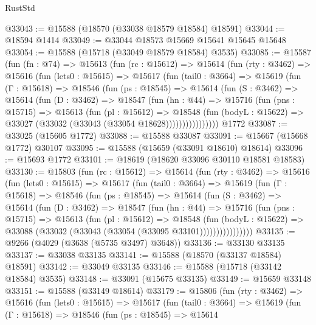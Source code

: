 \begin{lexlean}{RustStd}
\begin{coremodule}
@33043 := @15588 (@18570 (@33038 @18579 @18584) @18591)
@33044 := @18594 @1414
@33049 := @33044 @18573 @15669 @15641 @15645 @15648
@33054 := @15588 (@15718 (@33049 @18579 @18584) @3535)
@33085 := @15587
    (fun (fn : @74) =>
    @15613
      (fun (rc : @15612) =>
      @15614
        (fun (rty : @3462) =>
        @15616
          (fun (lets0 : @15615) =>
          @15617
            (fun (tail0 : @3664) =>
            @15619
              (fun (Γ : @15618) =>
              @18546
                (fun (ps : @18545) =>
                @15614
                  (fun (S : @3462) =>
                  @15614
                    (fun (D : @3462) =>
                    @18547
                      (fun (hn : @44) =>
                      @15716
                        (fun (pns : @15715) =>
                        @15613
                          (fun (pl : @15612) =>
                          @18548
                            (fun (bodyL : @15622) =>
                            @33027 (@33032 (@33043 (@33054 @18628))))))))))))))))
    @1772
@33087 := @33025 (@15605 @1772)
@33088 := @15588 @33087
@33091 := @15667 (@15668 @1772) @30107
@33095 := @15588 (@15659 (@33091 @18610) @18614)
@33096 := @15693 @1772
@33101 := @18619 (@18620 @33096 @30110 @18581 @18583)
@33130 := @15803
    (fun (rc : @15612) =>
    @15614
      (fun (rty : @3462) =>
      @15616
        (fun (lets0 : @15615) =>
        @15617
          (fun (tail0 : @3664) =>
          @15619
            (fun (Γ : @15618) =>
            @18546
              (fun (ps : @18545) =>
              @15614
                (fun (S : @3462) =>
                @15614
                  (fun (D : @3462) =>
                  @18547
                    (fun (hn : @44) =>
                    @15716
                      (fun (pns : @15715) =>
                      @15613
                        (fun (pl : @15612) =>
                        @18548
                          (fun (bodyL : @15622) =>
                          @33088 (@33032 (@33043 (@33054 (@33095 @33101))))))))))))))))
@33135 := @9266 (@4029 (@3638 (@5735 @3497) @3648))
@33136 := @33130 @33135
@33137 := @33038 @33135
@33141 := @15588 (@18570 (@33137 @18584) @18591)
@33142 := @33049 @33135
@33146 := @15588 (@15718 (@33142 @18584) @3535)
@33148 := @33091 (@15675 @33135)
@33149 := @15659 @33148
@33151 := @15588 (@33149 @18614)
@33179 := @15806
    (fun (rty : @3462) =>
    @15616
      (fun (lets0 : @15615) =>
      @15617
        (fun (tail0 : @3664) =>
        @15619
          (fun (Γ : @15618) =>
          @18546
            (fun (ps : @18545) =>
            @15614

\end{coremodule}
\end{lexlean}
